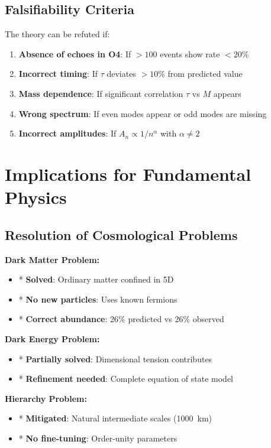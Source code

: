 \documentclass[10pt]{article}
\begin{document}
\subsection{Falsifiability Criteria}

The theory can be refuted if:
\begin{enumerate}[itemsep=0pt]
\item \textbf{Absence of echoes in O4}: If $> 100$ events show rate $< 20\%$
\item \textbf{Incorrect timing}: If $\tau$ deviates $> 10\%$ from predicted value
\item \textbf{Mass dependence}: If significant correlation $\tau$ vs $M$ appears
\item \textbf{Wrong spectrum}: If even modes appear or odd modes are missing
\item \textbf{Incorrect amplitudes}: If $A_n \propto 1/n^\alpha$ with $\alpha \neq 2$
\end{enumerate}

\section{Implications for Fundamental Physics}

\subsection{Resolution of Cosmological Problems}

\textbf{Dark Matter Problem:}
\begin{itemize}[itemsep=0pt]
\item *  \textbf{Solved}: Ordinary matter confined in 5D
\item *  \textbf{No new particles}: Uses known fermions
\item *  \textbf{Correct abundance}: 26\% predicted vs 26\% observed
\end{itemize}

\textbf{Dark Energy Problem:}
\begin{itemize}[itemsep=0pt]
\item *  \textbf{Partially solved}: Dimensional tension contributes
\item *  \textbf{Refinement needed}: Complete equation of state model
\end{itemize}

\textbf{Hierarchy Problem:}
\begin{itemize}[itemsep=0pt]
\item *  \textbf{Mitigated}: Natural intermediate scales (1000~km)
\item *  \textbf{No fine-tuning}: Order-unity parameters
\end{itemize}
\end{document}
